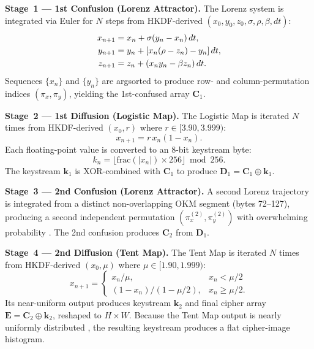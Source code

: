 \documentclass[conference]{IEEEtran}
\begin{document}
\textbf{Stage~1 --- 1st Confusion (Lorenz Attractor).}
The Lorenz system is integrated via Euler for $N$ steps from HKDF-derived $(x_0,y_0,z_0,\sigma,\rho,\beta,dt)$:
\begin{align}
	x_{n+1} &= x_n + \sigma(y_n - x_n)\,dt, \notag \\
	y_{n+1} &= y_n + [x_n(\rho - z_n) - y_n]\,dt, \label{eq:lorenz_euler} \\
	z_{n+1} &= z_n + (x_n y_n - \beta z_n)\,dt. \notag
\end{align}
Sequences $\{x_n\}$ and $\{y_n\}$ are argsorted to produce row- and column-permutation indices $(\pi_x, \pi_y)$, yielding the 1st-confused array $\mathbf{C}_1$.

\textbf{Stage~2 --- 1st Diffusion (Logistic Map).}
The Logistic Map is iterated $N$ times from HKDF-derived $(x_0, r)$ where $r \in [3.90, 3.999)$:
\begin{equation}
	x_{n+1} = r\,x_n(1-x_n).
	\label{eq:logistic_enc}
\end{equation}
Each floating-point value is converted to an 8-bit keystream byte:
\begin{equation}
	k_n = \lfloor\mathrm{frac}(|x_n|)\times256\rfloor\bmod 256.
	\label{eq:logistic_byte}
\end{equation}
The keystream $\mathbf{k}_1$ is XOR-combined with $\mathbf{C}_1$ to produce $\mathbf{D}_1 = \mathbf{C}_1 \oplus \mathbf{k}_1$.

\textbf{Stage~3 --- 2nd Confusion (Lorenz Attractor).}
A second Lorenz trajectory is integrated from a distinct non-overlapping OKM segment (bytes 72--127), producing a second independent permutation $(\pi_x^{(2)}, \pi_y^{(2)})$ with overwhelming probability \cite{b8,b19}. The 2nd confusion produces $\mathbf{C}_2$ from $\mathbf{D}_1$.

\textbf{Stage~4 --- 2nd Diffusion (Tent Map).}
The Tent Map is iterated $N$ times from HKDF-derived $(x_0, \mu)$ where $\mu \in [1.90, 1.999)$:
\begin{equation}
	x_{n+1} = \begin{cases} x_n/\mu, & x_n < \mu/2 \\ (1-x_n)/(1-\mu/2), & x_n \geq \mu/2. \end{cases}
	\label{eq:tent_enc}
\end{equation}
Its near-uniform output produces keystream $\mathbf{k}_2$ and final cipher array $\mathbf{E}=\mathbf{C}_2\oplus\mathbf{k}_2$, reshaped to $H\!\times\!W$. Because the Tent Map output is nearly uniformly distributed \cite{b25}, the resulting keystream produces a flat cipher-image histogram.
\end{document}
